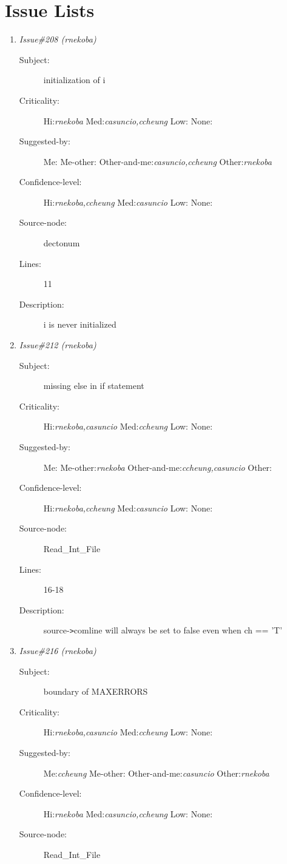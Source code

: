 \section{Issue Lists}
\begin{enumerate}
\item {\it Issue\#208 (rnekoba)}
\begin{description}
\item [Subject:] initialization of i
\item [Criticality:] Hi:{\it rnekoba} Med:{\it casuncio,ccheung} Low:{\it } None:{\it }
\item [Suggested-by:] Me:{\it } Me-other:{\it } Other-and-me:{\it casuncio,ccheung} Other:{\it rnekoba}
\item [Confidence-level:] Hi:{\it rnekoba,ccheung} Med:{\it casuncio} Low:{\it } None:{\it }
\item [Source-node:] dectonum

\item [Lines:] 11

\item [Description:] i is never initialized
\end{description}
\item {\it Issue\#212 (rnekoba)}
\begin{description}
\item [Subject:] missing else in if statement
\item [Criticality:] Hi:{\it rnekoba,casuncio} Med:{\it ccheung} Low:{\it } None:{\it }
\item [Suggested-by:] Me:{\it } Me-other:{\it rnekoba} Other-and-me:{\it ccheung,casuncio} Other:{\it }
\item [Confidence-level:] Hi:{\it rnekoba,ccheung} Med:{\it casuncio} Low:{\it } None:{\it }
\item [Source-node:] Read\_Int\_File

\item [Lines:] 16-18

\item [Description:] source-{\tt >}comline will always be set to false
even when ch == 'T'
\end{description}
\item {\it Issue\#216 (rnekoba)}
\begin{description}
\item [Subject:] boundary of MAXERRORS
\item [Criticality:] Hi:{\it rnekoba,casuncio} Med:{\it ccheung} Low:{\it } None:{\it }
\item [Suggested-by:] Me:{\it ccheung} Me-other:{\it } Other-and-me:{\it casuncio} Other:{\it rnekoba}
\item [Confidence-level:] Hi:{\it rnekoba} Med:{\it casuncio,ccheung} Low:{\it } None:{\it }
\item [Source-node:] Read\_Int\_File


\end{description}
\end{enumerate}
